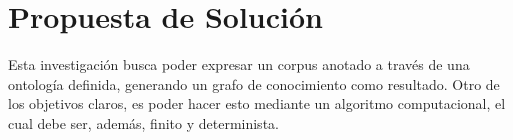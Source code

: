 \chapter{Propuesta de Solución}\label{chapter:proposed-solution}
Esta investigación busca poder expresar un corpus anotado a través de una ontología definida, generando un grafo de conocimiento como resultado. Otro de los objetivos claros, es poder hacer esto mediante un algoritmo computacional, el cual debe ser, además, finito y determinista. 








